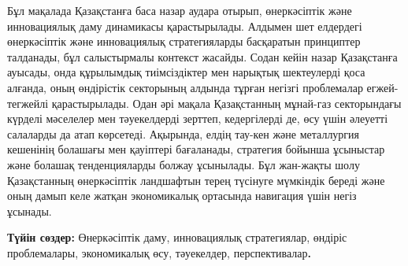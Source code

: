 Бұл мақалада Қазақстанға баса назар аудара отырып, өнеркәсіптік және
инновациялық даму динамикасы қарастырылады. Алдымен шет елдердегі
өнеркәсіптік және инновациялық стратегияларды басқаратын принциптер
талданады, бұл салыстырмалы контекст жасайды. Содан кейін назар
Қазақстанға ауысады, онда құрылымдық тиімсіздіктер мен нарықтық
шектеулерді қоса алғанда, оның өндірістік секторының алдында тұрған
негізгі проблемалар егжей-тегжейлі қарастырылады. Одан әрі мақала
Қазақстанның мұнай-газ секторындағы күрделі мәселелер мен тәуекелдерді
зерттеп, кедергілерді де, өсу үшін әлеуетті салаларды да атап көрсетеді.
Ақырында, елдің тау-кен және металлургия кешенінің болашағы мен
қауіптері бағаланады, стратегия бойынша ұсыныстар және болашақ
тенденцияларды болжау ұсынылады. Бұл жан-жақты шолу Қазақстанның
өнеркәсіптік ландшафтын терең түсінуге мүмкіндік береді және оның дамып
келе жатқан экономикалық ортасында навигация үшін негіз ұсынады.

{\bfseries Түйін сөздер:} Өнеркәсіптік даму, инновациялық стратегиялар,
өндіріс проблемалары, экономикалық өсу, тәуекелдер,
перспективалар{\bfseries .}


